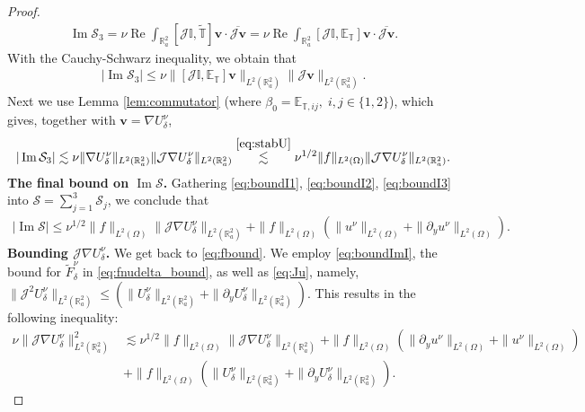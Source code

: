 \documentclass[report]{elsarticle}
\numberwithin{theorem}{section}
\renewcommand{\Im}{\operatorname{Im}}
\renewcommand{\Re}{\operatorname{Re}}
\renewcommand{\vec}[1]{\mathbf{#1}}
\begin{document}
\begin{proof}
\begin{align}
	\label{eq:I3}
	\Im\mathcal{S}_3=\nu\Re \int_{\mathbb{R}_a^2}[\mathcal{J}\mathbb{I}, \mathbb{\widetilde{T}}]\vec{v}\cdot\overline{\mathcal{J}\vec{v}}=\nu\Re \int_{\mathbb{R}_a^2}[\mathcal{J}\mathbb{I}, \mathbb{E}_{\mathbb{T}}]\vec{v}\cdot\overline{\mathcal{J}\vec{v}}.
\end{align}
With the Cauchy-Schwarz inequality, we obtain that 
\begin{align*}
	|\Im \mathcal{S}_3|\leq \nu \|[\mathcal{J}\mathbb{I}, \mathbb{E}_{\mathbb{T}}]\vec{v}\|_{L^2(\mathbb{R}^2_a)}\|{\mathcal{J}\vec{v}}\|_{L^2(\mathbb{R}^2_a)}.
\end{align*}
Next we use Lemma \ref{lem:commutator} (where $\beta_0=\mathbb{E}_{\mathbb{T},ij},\; i,j\in\{1,2\}$), which gives, together with $\vec{v}=\nabla U^{\nu}_{\delta}$,  
\begin{align}
	\label{eq:boundI3}
	|\Im \mathcal{S}_3|\lesssim \nu \|\nabla U^{\nu}_{\delta}\|_{L^2(\mathbb{R}^2_a)}\|\mathcal{J}\nabla U^{\nu}_{\delta}\|_{L^2(\mathbb{R}^2_a)}\overset{\eqref{eq:stabU}}{\lesssim} \nu^{1/2}\|f\|_{L^2(\Omega)}\|\mathcal{J}\nabla U^{\nu}_{\delta}\|_{L^2(\mathbb{R}^2_a)}.
\end{align}	
\textbf{The final bound on $\Im \mathcal{S}$. }	Gathering \eqref{eq:boundI1}, \eqref{eq:boundI2}, \eqref{eq:boundI3} into $\mathcal{S}=\sum\limits_{j=1}^3\mathcal{S}_j$, we conclude that 
\begin{align}
	\label{eq:boundImI}
	|\Im \mathcal{S}|\leq \nu^{1/2}\|f\|_{L^2(\Omega)}\|\mathcal{J}\nabla U^{\nu}_{\delta}\|_{L^2(\mathbb{R}^2_a)}+\|f\|_{L^2(\Omega)}(\|u^{\nu}\|_{L^2(\Omega)}+\|\partial_y u^{\nu}\|_{L^2(\Omega)}).
\end{align}
\textbf{Bounding $\mathcal{J}\nabla U^{\nu}_{\delta}$. }We get back to \eqref{eq:fbound}. We employ  \eqref{eq:boundImI}, the bound for $\widetilde{F}^{\nu}_{\delta}$ in \eqref{eq:fnudelta_bound}, as well as \eqref{eq:Ju}, namely, $\|\mathcal{J}^2U^{\nu}_{\delta}\|_{L^2(\mathbb{R}^2_a)}\leq \left(\|U^{\nu}_{\delta}\|_{L^2(\mathbb{R}^2_a)}+\|\partial_y U^{\nu}_{\delta}\|_{L^2(\mathbb{R}^2_a)}\right)$. This results in the following inequality:
\begin{align*}
	\nu\|\mathcal{J}\nabla U^{\nu}_{\delta}\|^2_{L^2(\mathbb{R}^2_a)}&\lesssim \nu^{1/2}\|f\|_{L^2(\Omega)}\|\mathcal{J}\nabla U^{\nu}_{\delta}\|_{L^2(\mathbb{R}^2_a)}+\|f\|_{L^2(\Omega)}\left(\|\partial_y u^{\nu}\|_{L^2(\Omega)}+\|u^{\nu}\|_{L^2(\Omega)}\right)\\
	&+\|f\|_{L^2(\Omega)}(\|U^{\nu}_{\delta}\|_{L^2(\mathbb{R}^2_a)}+\|\partial_y U^{\nu}_{\delta}\|_{L^2(\mathbb{R}^2_a)}).

\end{align*}
\end{proof}
\end{document}
